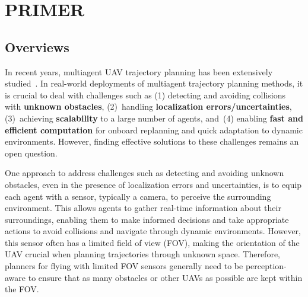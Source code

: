 \chapter{PRIMER}\label{chap:primer}

\section{Overviews}\label{sec:primer-overviews}


In recent years, multiagent UAV trajectory planning has been extensively studied~\cite{ryou_cooperative_2022, peng2022obstacle, gao2022meeting, tordesillas2020mader, kondo2023robust, zhou2020ego-swarm, sebetghadam2022distributed, robinson2018efficient, park2020efficient, Hou2022EnhancedDA, firoozi2020distributed, toumieh2023decentralized, wang2022robust, batra2022decentralized}. In real-world deployments of multiagent trajectory planning methods, it is crucial to deal with challenges such as (1) detecting and avoiding collisions with \textbf{unknown obstacles}, (2)~handling \textbf{localization errors/uncertainties}, (3)~achieving \textbf{scalability} to a large number of agents, and~(4) enabling \textbf{fast and efficient computation} for onboard replanning and quick adaptation to dynamic environments. However, finding effective solutions to these challenges remains an open question.

One approach to address challenges such as detecting and avoiding unknown obstacles, even in the presence of localization errors and uncertainties, is to equip each agent with a sensor, typically a camera, to perceive the surrounding environment. This allows agents to gather real-time information about their surroundings, enabling them to make informed decisions and take appropriate actions to avoid collisions and navigate through dynamic environments.
However, this sensor often has a limited field of view (FOV), making the orientation of the UAV crucial when planning trajectories through unknown space. Therefore, planners for flying with limited FOV sensors generally need to be perception-aware to ensure that as many obstacles or other UAVs as possible are kept within the FOV.

